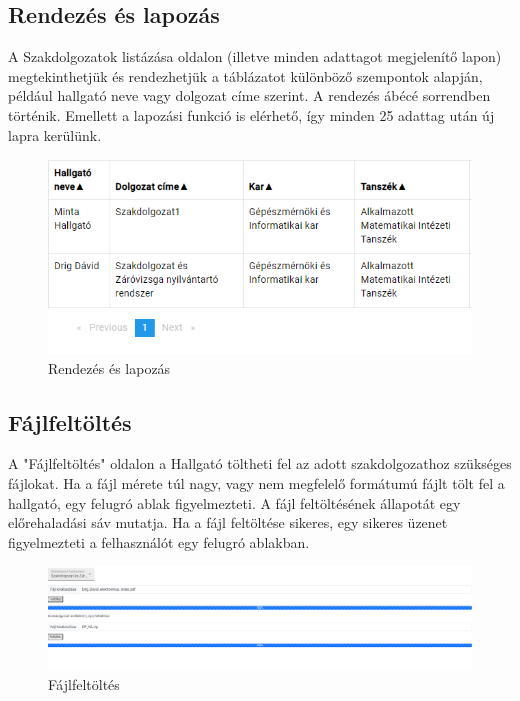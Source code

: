 \subsection{Rendezés és lapozás}

A Szakdolgozatok listázása oldalon (illetve minden adattagot megjelenítő lapon) megtekinthetjük és rendezhetjük a táblázatot különböző szempontok alapján, például hallgató neve vagy dolgozat címe szerint. A rendezés ábécé sorrendben történik. Emellett a lapozási funkció is elérhető, így minden 25 adattag után új lapra kerülünk.

\begin{figure}[h!]
\centering
\includegraphics[width=\textwidth]{images/Orderby_pagination.png}
\caption{Rendezés és lapozás}
\label{fig:Orderby_pagination}
\end{figure}

\subsection{Fájlfeltöltés}

A "Fájlfeltöltés" oldalon a Hallgató töltheti fel az adott szakdolgozathoz szükséges fájlokat. Ha a fájl mérete túl nagy, vagy nem megfelelő formátumú fájlt tölt fel a hallgató, egy felugró ablak figyelmezteti. A fájl feltöltésének állapotát egy előrehaladási sáv mutatja. Ha a fájl feltöltése sikeres, egy sikeres üzenet figyelmezteti a felhasználót egy felugró ablakban.


\begin{figure}[h!]
\centering
\includegraphics[width=\textwidth]{images/Upload_files.png}
\caption{Fájlfeltöltés}
\label{fig:Upload_files}
\end{figure}



